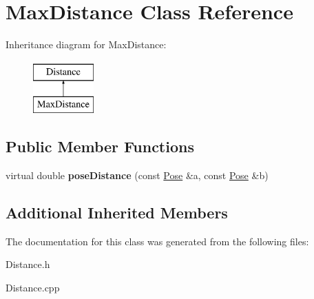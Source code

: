 \hypertarget{classMaxDistance}{}\section{Max\+Distance Class Reference}
\label{classMaxDistance}
Inheritance diagram for Max\+Distance\+:\begin{figure}[H]
\begin{center}
\leavevmode
\includegraphics[height=2.000000cm]{classMaxDistance}
\end{center}
\end{figure}
\subsection*{Public Member Functions}
\begin{DoxyCompactItemize}
\item 
\hypertarget{classMaxDistance_a9decef3b40da1568a12c87d4934a9c05}{}virtual double {\bfseries pose\+Distance} (const \hyperlink{classPose}{Pose} \&a, const \hyperlink{classPose}{Pose} \&b)\label{classMaxDistance_a9decef3b40da1568a12c87d4934a9c05}

\end{DoxyCompactItemize}
\subsection*{Additional Inherited Members}


The documentation for this class was generated from the following files\+:\begin{DoxyCompactItemize}
\item 
Distance.\+h\item 
Distance.\+cpp\end{DoxyCompactItemize}
